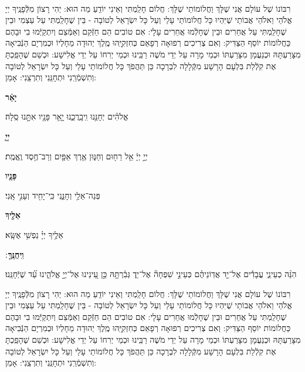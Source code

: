 \documentclass[twoside, openany, parskip=half, 11pt]{book}
\begin{document}
\\

 רִבּוֹנוֹ שֶׁל עוֹלָם אֲנִי שֶׁלָּךְ וַחֲלוֹמוֹתַי שֶׁלָּךְ: חֲלוֹם חָלַֽמְתִּי וְאֵינִי יוֹדֵֽעַ מַה הוּא: יְהִי רָצוֹן מִלְּֿפָנֶֽיךָ יְיָ אֱלֹהַי וֵאלֹהֵי אֲבוֹתַי שֶׁיִּהְיוּ כָּל חֲלוֹמוֹתַי עָלַי וְעַל כָּל יִשְׂרָאֵל לְטוֹבָה - בֵּין שֶׁחָלַֽמְתִּי עַל עַצְמִי וּבֵין שֶׁחָלַֽמְתִּי עַל אֲחֵרִים וּבֵין שֶׁחָלְֿמוּ אֲחֵרִים עָלָי: אִם טוֹבִים הֵם חַזְּֿקֵם וְאַמְּֿצֵם וְיִתְקַיְּֿמוּ בִי וּבָהֶם כַּחֲלוֹמוֹת יוֹסֵף הַצַּדִּיק: וְאִם צְרִיכִים רְפוּאָה רְפָאֵם כְּחִזְקִיָּֽהוּ מֶֽלֶךְ יְהוּדָה מֵחָלְיוֹ וּכְמִרְיָם הַנְּֿבִיאָה מִצָּרַעְתָּהּ וּכְנַעֲמָן מִצָּרַעְתּוֹ וּכְמֵי מָרָה עַל יְדֵי מֹשֶׁה רַבֵּֽינוּ וּכְמֵי יְרִחוֹ עַל יְדֵי אֱלִישָׁע: וּכְשֵׁם שֶׁהָפַֽכְתָּ אֶת קִלְֿלַת בִּלְעָם הָרָשָׁע מִקְּֿלָלָה לִבְרָכָה כֵּן תַּהֲפֹךְ כָּל חֲלוֹמוֹתַי עָלַי וְעַל כָּל יִשְׂרָאֵל לְטוֹבָה וְתִשְׁמְֿרֵֽנִי וּתְחָנֵּֽנִי וְתִרְצֵֽנִי: אָמֵן:
  


\textbf{יָאֵ֨ר}
 \hfill 	\begin{footnotesize}
 אֱלֹהִ֗ים יְחָנֵּ֥נוּ וִֽיבָֽרֲכֵ֑נוּ יָ֤אֵ֥ר פָּנָ֖יו אִתָּ֣נוּ סֶֽלָה׃\\
 \end{footnotesize}
\textbf{יְיָ֧}
 \hfill 	\begin{footnotesize}
 יְיָ֣ יְיָ֔ אֵ֥ל רַח֖וּם וְחַנּ֑וּן אֶ֥רֶךְ אַפַּ֖יִם וְרַב־חֶ֥סֶד וֶֽאֱמֶֽת׃\\
 \end{footnotesize}
\textbf{פָּנָ֛יו}
	\hfill \begin{footnotesize}
	פְּנֵה־אֵלַ֥י וְחָנֵּ֑נִי כִּֽי־יָחִ֖יד וְעָנִ֣י אָֽנִי׃\\
	\end{footnotesize}
\textbf{אֵלֶ֖יךָ}
	\hfill		\begin{footnotesize}
	אֵלֶ֥יךָ יְיָ֗ נַפְשִׁ֥י אֶשָּֽׂא׃\\
	\end{footnotesize}
\textbf{וִֽיחֻנֶּֽךָּ}
׃	\hfill		\begin{footnotesize}
הִנֵּ֨ה כְעֵינֵ֢י עֲבָדִ֡ים אֶל־יַ֤ד אֲדֽוֹנֵיהֶ֗ם כְּעֵינֵ֣י שִׁפְחָה֘ אֶל־יַד֢ גְּבִ֫רְתָּ֥הּ כֵּ֣ן עֵ֭ינֵינוּ אֶל־יְיָ֣ אֱלֹהֵ֑ינוּ עַ֝֗ד שֶׁיְּֿחָנֵּֽנוּ׃
\end{footnotesize}


 רִבּוֹנוֹ שֶׁל עוֹלָם אֲנִי שֶׁלָּךְ וַחֲלוֹמוֹתַי שֶׁלָּךְ: חֲלוֹם חָלַֽמְתִּי וְאֵינִי יוֹדֵֽעַ מַה הוּא: יְהִי רָצוֹן מִלְּֿפָנֶֽיךָ יְיָ אֱלֹהַי וֵאלֹהֵי אֲבוֹתַי שֶׁיִּהְיוּ כָּל חֲלוֹמוֹתַי עָלַי וְעַל כָּל יִשְׂרָאֵל לְטוֹבָה - בֵּין שֶׁחָלַֽמְתִּי עַל עַצְמִי וּבֵין שֶׁחָלַֽמְתִּי עַל אֲחֵרִים וּבֵין שֶׁחָלְֿמוּ אֲחֵרִים עָלָי: אִם טוֹבִים הֵם חַזְּֿקֵם וְאַמְּֿצֵם וְיִתְקַיְּֿמוּ בִי וּבָהֶם כַּחֲלוֹמוֹת יוֹסֵף הַצַּדִּיק: וְאִם צְרִיכִים רְפוּאָה רְפָאֵם כְּחִזְקִיָּֽהוּ מֶֽלֶךְ יְהוּדָה מֵחָלְיוֹ וּכְמִרְיָם הַנְּֿבִיאָה מִצָּרַעְתָּהּ וּכְנַעֲמָן מִצָּרַעְתּוֹ וּכְמֵי מָרָה עַל יְדֵי מֹשֶׁה רַבֵּֽינוּ וּכְמֵי יְרִחוֹ עַל יְדֵי אֱלִישָׁע: וּכְשֵׁם שֶׁהָפַֽכְתָּ אֶת קִלְֿלַת בִּלְעָם הָרָשָׁע מִקְּֿלָלָה לִבְרָכָה כֵּן תַּהֲפֹךְ כָּל חֲלוֹמוֹתַי עָלַי וְעַל כָּל יִשְׂרָאֵל לְטוֹבָה וְתִשְׁמְֿרֵֽנִי וּתְחָנֵּֽנִי וְתִרְצֵֽנִי: אָמֵן:
  
\end{document}
